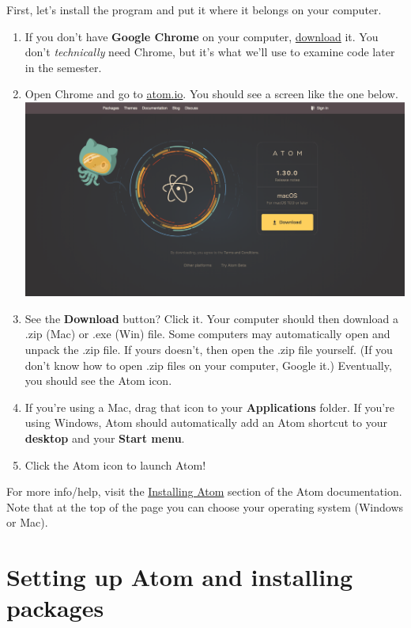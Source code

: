 \documentclass[]{book}
\providecommand{\tightlist}{%
  \setlength{\itemsep}{0pt}\setlength{\parskip}{0pt}}
\theoremstyle{definition}
\theoremstyle{definition}
\theoremstyle{definition}
\theoremstyle{remark}
\begin{document}
First, let's install the program and put it where it belongs on your
computer.

\begin{enumerate}
\def\labelenumi{\arabic{enumi}.}
\tightlist
\item
  If you don't have \textbf{Google Chrome} on your computer,
  \href{https://support.google.com/chrome/answer/95346?co=GENIE.Platform\%3DDesktop\&hl=en}{download}
  it. You don't \emph{technically} need Chrome, but it's what we'll use
  to examine code later in the semester.
\item
  Open Chrome and go to \href{https://atom.io/}{atom.io}. You should see
  a screen like the one below.\\
  \includegraphics{atom-getting-started.png}
\item
  See the \textbf{Download} button? Click it. Your computer should then
  download a .zip (Mac) or .exe (Win) file. Some computers may
  automatically open and unpack the .zip file. If yours doesn't, then
  open the .zip file yourself. (If you don't know how to open .zip files
  on your computer, Google it.) Eventually, you should see the Atom
  icon.
\item
  If you're using a Mac, drag that icon to your \textbf{Applications}
  folder. If you're using Windows, Atom should automatically add an Atom
  shortcut to your \textbf{desktop} and your \textbf{Start menu}.~
\item
  Click the Atom icon to launch Atom!
\end{enumerate}

For more info/help, visit the
\href{http://flight-manual.atom.io/getting-started/sections/installing-atom/\#platform-mac}{Installing
Atom} section of the Atom documentation. Note that at the top of the
page you can choose your operating system (Windows or Mac).

\hypertarget{setting-up-atom-and-installing-packages}{%
\section{Setting up Atom and installing
packages}\label{setting-up-atom-and-installing-packages}}
\end{document}
